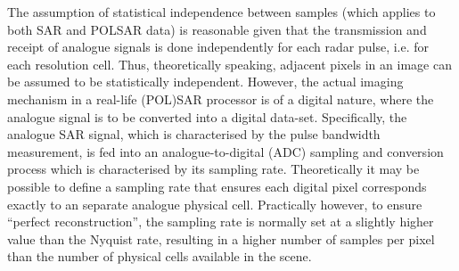 \documentclass[journal]{IEEEtran}
\begin{document}

The assumption of statistical independence between samples (which applies to both SAR and POLSAR data) is reasonable given that 
  the transmission and receipt of analogue signals is done independently for each radar pulse, i.e. for each resolution cell.
Thus, theoretically speaking, adjacent pixels in an image can be assumed to be statistically independent.
However, the actual imaging mechanism in a real-life (POL)SAR processor is of a digital nature,
where the analogue signal is to be converted into a digital data-set. 
Specifically, the analogue SAR signal, 
  which is characterised by the pulse bandwidth measurement,
  is fed into an analogue-to-digital (ADC) sampling and conversion process 
  which is characterised by its sampling rate.
Theoretically it may be possible to define a sampling rate that ensures each digital pixel corresponds exactly to an separate analogue physical cell.
Practically however, to ensure ``perfect reconstruction'', the sampling rate is normally set at a slightly higher value than the Nyquist rate, resulting in a higher number of samples per pixel than the number of physical cells available in the scene.  
\end{document}
